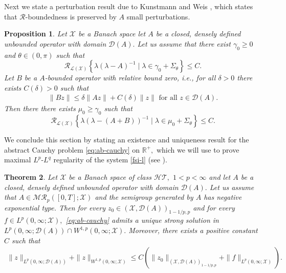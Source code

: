 \documentclass[12pt,a4paper,reqno]{amsart}
\newtheorem{theorem}{Theorem}[section]
\newtheorem{proposition}[theorem]{Proposition}
\theoremstyle{definition}
\theoremstyle{remark}
\numberwithin{equation}{section}
\newcommand{\mx}{\mathcal{X}}
\newcommand{\md}{\mathcal{D}}
\newcommand{\mr}{\mathcal{R}}
\begin{document}
Next we state  a  perturbation result  due to Kunstmann and Weis \cite{WeisKun01}, which states that $\mr$-boundedness is preserved by $A$ small perturbations.
\begin{proposition} \label{pr:perturb}
Let $\mx$ be a Banach space  let $A$ be a closed, densely defined unbounded operator with domain $\md(A).$ Let  us assume that there exist $\gamma_{0} \geqslant  0$ and $\theta \in (0,\pi)$ such that
\begin{equation*}
\mr_{\mathcal{L}(\mx)}\left\{\lambda (\lambda - A)^{-1} \mid \lambda  \in \gamma_{0} + \Sigma_{\theta}\right\} \leqslant C.
\end{equation*}
 Let $B$ be a $A$-bounded operator with relative bound zero, i.e., for all $\delta > 0$ there exists $C(\delta) > 0$ such that
\begin{align}
\|Bz\| \leqslant \delta \|Az\| + C(\delta) \|z\| \mbox{ for all }   z \in \md(A).
\end{align}
Then there there exists  $\mu_{0} \geqslant \gamma_{0}$ such that
\begin{equation*}
\mr_{\mathcal{L}(\mx)}\left\{\lambda (\lambda - (A+B))^{-1} \mid \lambda  \in \mu_{0} + \Sigma_{\theta}\right\} \leqslant C.
\end{equation*}
\end{proposition}

We conclude this section by stating an existence and uniqueness result for the abstract Cauchy problem \eqref{eq:ab-cauchy} on $\mathbb{R}^{+},$ which we will use to prove maximal $L^{p}$-$L^{q}$ regularity of the system  \eqref{fsi-l} (see \cite[Theorem 2.4]{Dor1993}).

\begin{theorem} \label{th:ab-i}
Let $\mx$ be a Banach space of class $\mathcal{HT},$ $1 < p < \infty$ and let $A$ be a closed, densely defined unbounded operator with domain $\md(A).$  Let  us assume that $A \in \mathcal{MR}_{p}([0,T];\mx)$
and  the semigroup generated by $A$ has negative exponential type. Then for every $z_{0} \in (\mx, \md(A))_{1-1/p,p}$ and for every $f \in L^{p}(0,\infty;\mx),$ \eqref{eq:ab-cauchy} admits a unique strong solution in $L^{p}(0,\infty;\md(A)) \cap W^{1,p}(0,\infty;\mx).$ Moreover, there exists a positive constant $C$ such that
\begin{align} \label{est:ab}
\|z\|_{L^{p}(0,\infty;\md(A))} + \|z\|_{W^{1,p}(0,\infty;\mx)} \leqslant C \left( \|z_{0}\|_{(\mx, \md(A))_{1-1/p,p}} + \|f\|_{L^{p}(0,\infty;\mx)}\right).
\end{align}
\end{theorem}
\end{document}
